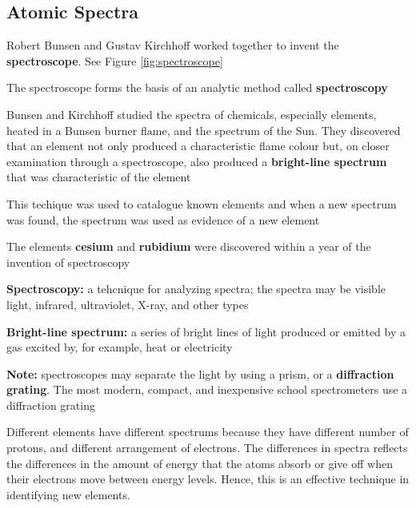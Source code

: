 \subsection{Atomic Spectra}
\begin{bulleted-list}
    \item Robert Bunsen and Gustav Kirchhoff worked together to invent the \textbf{spectroscope}.
        See Figure \ref{fig:spectroscope}
    \item The spectroscope forms the basis of an analytic method called \textbf{spectroscopy}
    \item Bunsen and Kirchhoff studied the spectra of chemicals, especially elements, heated in
        a Bunsen burner flame, and the spectrum of the Sun. They discovered that an element not
        only produced a characteristic flame colour but, on closer examination through a
        spectroscope, also produced a \textbf{bright-line spectrum} that was characteristic of
        the element
    \item This techique was used to catalogue known elements and when a new spectrum was found,
        the spectrum was used as evidence of a new element
    \item The elements \textbf{cesium} and \textbf{rubidium} were discovered within a year of
        the invention of spectroscopy
    \item \textbf{Spectroscopy:} a tehcnique for analyzing spectra; the spectra may be visible
        light, infrared, ultraviolet, X-ray, and other types
    \item \textbf{Bright-line spectrum:} a series of bright lines of light produced or emitted by
        a gas excited by, for example, heat or electricity
    \item \textbf{Note:} spectroscopes may separate the light by using a prism, or a
        \textbf{diffraction grating}. The most modern, compact, and inexpensive school spectrometers
        use a diffraction grating
\end{bulleted-list}

\begin{important}
    Different elements have different spectrums because they have different number of protons,
    and different arrangement of electrons. The differences in spectra reflects the differences
    in the amount of energy that the atoms absorb or give off when their electrons move between
    energy levels. Hence, this is an effective technique in identifying new elements.
\end{important}


